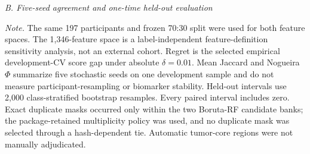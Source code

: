 \begin{table}[H]
\vspace{0.8em}
\textit{B. Five-seed agreement and one-time held-out evaluation}\par\smallskip
{}
\par\smallskip
\parbox{0.98\linewidth}{\scriptsize\textit{Note.} The same 197 participants and frozen 70:30 split were used for both feature spaces. The 1,346-feature space is a label-independent feature-definition sensitivity analysis, not an external cohort. Regret is the selected empirical development-CV score gap under absolute $\delta=0.01$. Mean Jaccard and Nogueira $\Phi$ summarize five stochastic seeds on one development sample and do not measure participant-resampling or biomarker stability. Held-out intervals use 2,000 class-stratified bootstrap resamples. Every paired interval includes zero. Exact duplicate masks occurred only within the two Boruta-RF candidate banks; the package-retained multiplicity policy was used, and no duplicate mask was selected through a hash-dependent tie. Automatic tumor-core regions were not manually adjudicated.}
\end{table}

